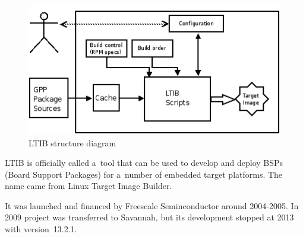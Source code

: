 \documentclass[printmode]{mgr}
\begin{document}
\begin{figure}[htbp]
  \centering
    \includegraphics[width=\textwidth]{ltib-diagram.png}
    \caption{LTIB structure diagram}
  \label{fig:ltib-diagram}
\end{figure}


LTIB is officially called a~tool that can be used to develop and deploy BSPs (Board Support Packages) for a~number of embedded target platforms. The name came from Linux Target Image Builder.

It was launched and financed by Freescale Seminconductor around 2004-2005. In 2009 project was transferred to Savannah, but its development stopped at 2013 with version~13.2.1.







\end{document}
